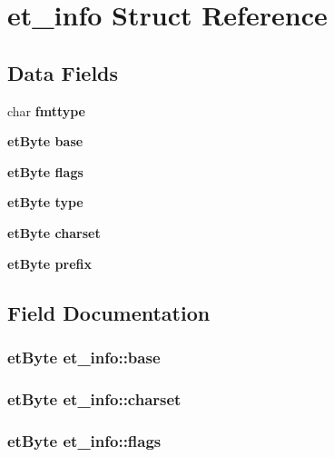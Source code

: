 \section{et\_\-info Struct Reference}
\label{structet__info}
\subsection*{Data Fields}
\begin{CompactItemize}
\item 
char \bf{fmttype}
\item 
\bf{et\-Byte} \bf{base}
\item 
\bf{et\-Byte} \bf{flags}
\item 
\bf{et\-Byte} \bf{type}
\item 
\bf{et\-Byte} \bf{charset}
\item 
\bf{et\-Byte} \bf{prefix}
\end{CompactItemize}


\subsection{Field Documentation}
\subsubsection{\setlength{\rightskip}{0pt plus 5cm}\bf{et\-Byte} \bf{et\_\-info::base}}\label{structet__info_cb1a4bd3e0d7a109296dae38dde929fa}


\subsubsection{\setlength{\rightskip}{0pt plus 5cm}\bf{et\-Byte} \bf{et\_\-info::charset}}\label{structet__info_c3acd2baa4794b9b8268420ce80dbc63}


\subsubsection{\setlength{\rightskip}{0pt plus 5cm}\bf{et\-Byte} \bf{et\_\-info::flags}}\label{structet__info_2f0c294b5b6e079cbde112f6d6218c73}


